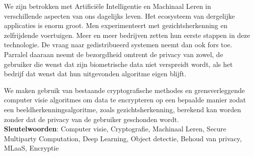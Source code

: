 We zijn betrokken met Artifici\"ele Intelligentie en Machinaal Leren in verschillende aspecten van ons dagelijks leven. Het ecosysteem van dergelijke applicaties is enorm groot. Men experimenteert met gezichtsherkenning en zelfrijdende voertuigen. Meer en meer bedrijven zetten hun eerste stappen in deze technologie. De vraag naar gedistribueerd systemen neemt dan ook fors toe. Parralel daaraan neemt de bezorgdheid omtrent de privacy van zowel, de gebruiker die wenst dat zijn biometrische data niet verspreidt wordt, als het bedrijf dat wenst dat hun uitgevonden algoritme eigen blijft.

We maken gebruik van bestaande cryptografische methodes en grensverleggende computer visie algoritmes om data te encrypteren op een bepaalde manier zodat een beeldherkenningsalgoritme, zoals gezichtsherkenning, berekend kan worden zonder dat de privacy van de gebruiker geschonden wordt.\\

\textbf{Sleutelwoorden}: Computer visie, Cryptografie, Machinaal Leren, Secure Multiparty Computation, Deep Learning, Object detectie, Behoud van privacy, MLaaS, Encryptie
